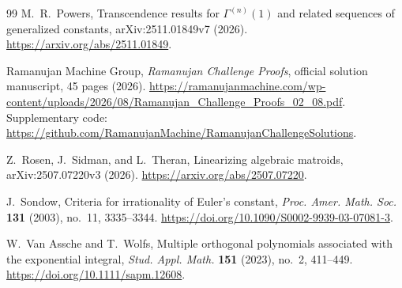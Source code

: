 \begin{thebibliography}{99}
M.~R.~Powers,
\newblock Transcendence results for
\(\Gamma^{(n)}(1)\) and related sequences of generalized constants,
\newblock arXiv:2511.01849v7 (2026).
\newblock \url{https://arxiv.org/abs/2511.01849}.

Ramanujan Machine Group,
\newblock \emph{Ramanujan Challenge Proofs},
\newblock official solution manuscript, 45 pages (2026).
\newblock
\url{https://ramanujanmachine.com/wp-content/uploads/2026/08/Ramanujan_Challenge_Proofs_02_08.pdf}.
\newblock Supplementary code:
\url{https://github.com/RamanujanMachine/RamanujanChallengeSolutions}.

Z.~Rosen, J.~Sidman, and L.~Theran,
\newblock Linearizing algebraic matroids,
\newblock arXiv:2507.07220v3 (2026).
\newblock \url{https://arxiv.org/abs/2507.07220}.

J.~Sondow,
\newblock Criteria for irrationality of Euler's constant,
\newblock \emph{Proc. Amer. Math. Soc.} \textbf{131} (2003), no.~11,
3335--3344.
\newblock \url{https://doi.org/10.1090/S0002-9939-03-07081-3}.

W.~Van Assche and T.~Wolfs,
\newblock Multiple orthogonal polynomials associated with the exponential
integral,
\newblock \emph{Stud. Appl. Math.} \textbf{151} (2023), no.~2, 411--449.
\newblock \url{https://doi.org/10.1111/sapm.12608}.

\end{thebibliography}
